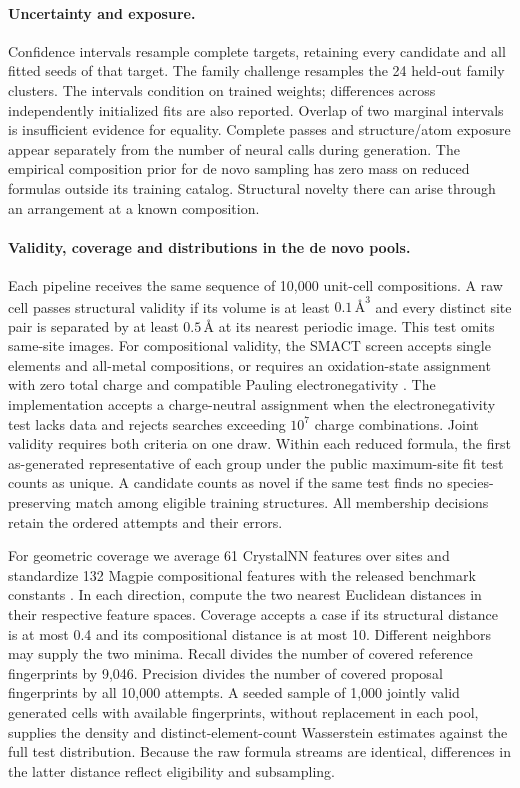 \paragraph{Uncertainty and exposure.} Confidence intervals resample complete targets, retaining every candidate and all fitted seeds of that target. The family challenge resamples the 24 held-out family clusters. The intervals condition on trained weights; differences across independently initialized fits are also reported. Overlap of two marginal intervals is insufficient evidence for equality. Complete passes and structure/atom exposure appear separately from the number of neural calls during generation. The empirical composition prior for de novo sampling has zero mass on reduced formulas outside its training catalog. Structural novelty there can arise through an arrangement at a known composition.

\paragraph{Validity, coverage and distributions in the de novo pools.} Each pipeline receives the same sequence of 10,000 unit-cell compositions. A raw cell passes structural validity if its volume is at least \(0.1\,\text{\AA}^3\) and every distinct site pair is separated by at least \(0.5\,\text{\AA}\) at its nearest periodic image. This test omits same-site images. For compositional validity, the SMACT screen accepts single elements and all-metal compositions, or requires an oxidation-state assignment with zero total charge and compatible Pauling electronegativity \cite{smact}. The implementation accepts a charge-neutral assignment when the electronegativity test lacks data and rejects searches exceeding \(10^7\) charge combinations. Joint validity requires both criteria on one draw. Within each reduced formula, the first as-generated representative of each group under the public maximum-site fit test counts as unique. A candidate counts as novel if the same test finds no species-preserving match among eligible training structures. All membership decisions retain the ordered attempts and their errors.

For geometric coverage we average 61 CrystalNN features over sites and standardize 132 Magpie compositional features with the released benchmark constants \cite{cdvae,diffcsp,matminer}. In each direction, compute the two nearest Euclidean distances in their respective feature spaces. Coverage accepts a case if its structural distance is at most 0.4 and its compositional distance is at most 10. Different neighbors may supply the two minima. Recall divides the number of covered reference fingerprints by 9,046. Precision divides the number of covered proposal fingerprints by all 10,000 attempts. A seeded sample of 1,000 jointly valid generated cells with available fingerprints, without replacement in each pool, supplies the density and distinct-element-count Wasserstein estimates against the full test distribution. Because the raw formula streams are identical, differences in the latter distance reflect eligibility and subsampling.

